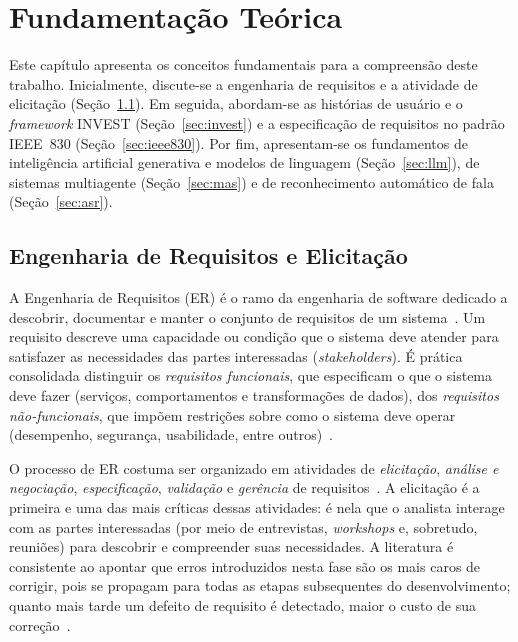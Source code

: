 
\chapter{Fundamentação Teórica}
\label{cap:fundamentacao}

Este capítulo apresenta os conceitos fundamentais para a compreensão deste trabalho. Inicialmente, discute-se a engenharia de requisitos e a atividade de elicitação (Seção~\ref{sec:er}). Em seguida, abordam-se as histórias de usuário e o \textit{framework} INVEST (Seção~\ref{sec:invest}) e a especificação de requisitos no padrão IEEE~830 (Seção~\ref{sec:ieee830}). Por fim, apresentam-se os fundamentos de inteligência artificial generativa e modelos de linguagem (Seção~\ref{sec:llm}), de sistemas multiagente (Seção~\ref{sec:mas}) e de reconhecimento automático de fala (Seção~\ref{sec:asr}).

\section{Engenharia de Requisitos e Elicitação}
\label{sec:er}

A Engenharia de Requisitos (ER) é o ramo da engenharia de software dedicado a descobrir, documentar e manter o conjunto de requisitos de um sistema~\cite{pohl2010}. Um requisito descreve uma capacidade ou condição que o sistema deve atender para satisfazer as necessidades das partes interessadas (\textit{stakeholders}). É prática consolidada distinguir os \textit{requisitos funcionais}, que especificam o que o sistema deve fazer (serviços, comportamentos e transformações de dados), dos \textit{requisitos não-funcionais}, que impõem restrições sobre como o sistema deve operar (desempenho, segurança, usabilidade, entre outros)~\cite{sommerville2015}.

O processo de ER costuma ser organizado em atividades de \textit{elicitação}, \textit{análise e negociação}, \textit{especificação}, \textit{validação} e \textit{gerência} de requisitos~\cite{pohl2010}. A elicitação é a primeira e uma das mais críticas dessas atividades: é nela que o analista interage com as partes interessadas (por meio de entrevistas, \textit{workshops} e, sobretudo, reuniões) para descobrir e compreender suas necessidades. A literatura é consistente ao apontar que erros introduzidos nesta fase são os mais caros de corrigir, pois se propagam para todas as etapas subsequentes do desenvolvimento; quanto mais tarde um defeito de requisito é detectado, maior o custo de sua correção~\cite{sommerville2015}.

